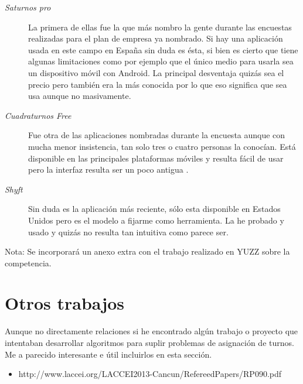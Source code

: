 \begin{description}
	\item[\emph{Saturnos pro}] La primera de ellas fue la que más nombro la gente durante las encuestas realizadas para el plan de empresa ya nombrado. Si hay una aplicación usada en este campo en España sin duda es ésta, si bien es cierto que tiene algunas limitaciones como por ejemplo que el único medio para usarla sea un dispositivo móvil con Android. La principal desventaja quizás sea el precio pero también era la más conocida por lo que eso significa que sea usa aunque no masivamente.
	\item[\emph{Cuadraturnos Free}] Fue otra de las aplicaciones nombradas durante la encuesta aunque con mucha menor insistencia, tan solo tres o cuatro personas la conocían. Está disponible en las principales plataformas móviles y resulta fácil de usar pero la interfaz resulta ser un poco antigua .
	\item[\emph{Shyft}] Sin duda es la aplicación más reciente, sólo esta disponible en Estados Unidos pero es el modelo a fijarme como herramienta. La he probado y usado y quizás no resulta tan intuitiva como parece ser.
\end{description}

Nota: Se incorporará un anexo extra con el trabajo realizado en YUZZ sobre la competencia. 

\section{Otros trabajos}
Aunque no directamente relaciones si he encontrado algún trabajo o proyecto que intentaban desarrollar algoritmos para suplir problemas de asignación de turnos. Me a parecido interesante e útil incluirlos en esta sección.
     \begin{itemize}
         \item http://www.laccei.org/LACCEI2013-Cancun/RefereedPapers/RP090.pdf
    \end{itemize}
